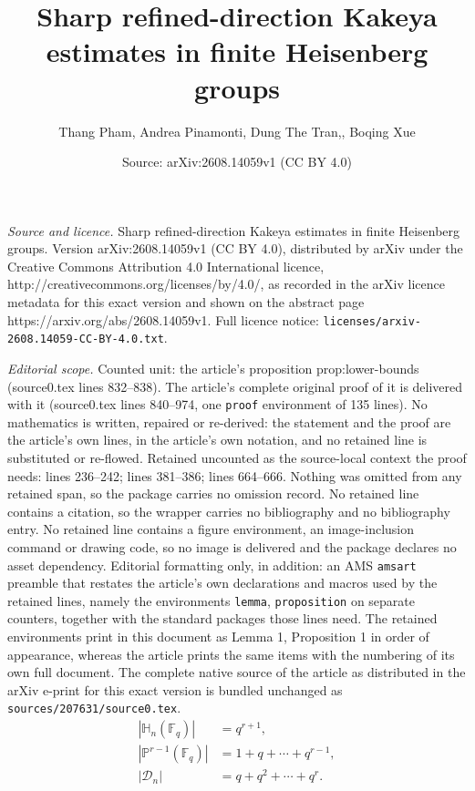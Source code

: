 \documentclass[10pt,a4paper]{amsart}
\title{Sharp refined-direction Kakeya estimates in finite Heisenberg groups}
\author{Thang Pham, Andrea Pinamonti, Dung The Tran,, Boqing Xue}
\date{Source: arXiv:2608.14059v1 (CC BY 4.0)}
\newcommand{\Dn}{\mathcal D_n}
\newcommand{\Fq}{\mathbb F_q}
\newcommand{\HH}{\mathbb H}
\newcommand{\PP}{\mathbb P}
\begin{document}
\maketitle

\noindent\emph{Source and licence.} Sharp refined-direction Kakeya estimates in finite Heisenberg groups. Version arXiv:2608.14059v1 (CC BY 4.0), distributed by arXiv under the Creative Commons Attribution 4.0 International licence, http://creativecommons.org/licenses/by/4.0/, as recorded in the arXiv licence metadata for this exact version and shown on the abstract page https://arxiv.org/abs/2608.14059v1. Full licence notice: \texttt{licenses/arxiv-2608.14059-CC-BY-4.0.txt}.\par\smallskip

\noindent\textit{Editorial scope.} Counted unit: the article's proposition prop:lower-bounds (source0.tex lines 832--838). The article's complete original proof of it is delivered with it (source0.tex lines 840--974, one \texttt{proof} environment of 135 lines). No mathematics is written, repaired or re-derived: the statement and the proof are the article's own lines, in the article's own notation, and no retained line is substituted or re-flowed.  Retained uncounted as the source-local context the proof needs: lines 236--242; lines 381--386; lines 664--666.  Nothing was omitted from any retained span, so the package carries no omission record.  No retained line contains a citation, so the wrapper carries no bibliography and no bibliography entry.  No retained line contains a figure environment, an image-inclusion command or drawing code, so no image is delivered and the package declares no asset dependency.  Editorial formatting only, in addition: an AMS \texttt{amsart} preamble that restates the article's own declarations and macros used by the retained lines, namely the environments \texttt{lemma}, \texttt{proposition} on separate counters, together with the standard packages those lines need.  The retained environments print in this document as Lemma 1, Proposition 1 in order of appearance, whereas the article prints the same items with the numbering of its own full document.  The complete native source of the article as distributed in the arXiv e-print for this exact version is bundled unchanged as \texttt{sources/207631/source0.tex}.
\begin{equation}\label{eq:cardinalities}
 \begin{aligned}
 |\HH_n(\Fq)|&=q^{r+1},\\
 |\PP^{r-1}(\Fq)|&=1+q+\cdots+q^{r-1},\\
 |\Dn|&=q+q^2+\cdots+q^r.
 \end{aligned}
\end{equation}
\end{document}
